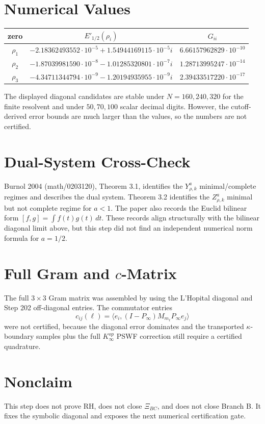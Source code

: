 \documentclass[11pt]{article}
\begin{document}
\section*{Numerical Values}

\begin{center}
\begin{tabular}{c c c}
\toprule
zero & \(E'_{1/2}(\rho_i)\) & \(G_{ii}\)\\
\midrule
\(\rho_1\) & \(-2.18362493552\cdot10^{-5}+1.54944169115\cdot10^{-5}i\) & \(6.66157962829\cdot10^{-10}\)\\
\(\rho_2\) & \(-1.87039981590\cdot10^{-8}-1.01285320801\cdot10^{-7}i\) & \(1.28713995247\cdot10^{-14}\)\\
\(\rho_3\) & \(-4.34711344794\cdot10^{-9}-1.20194935955\cdot10^{-9}i\) & \(2.39433517220\cdot10^{-17}\)\\
\bottomrule
\end{tabular}
\end{center}

The displayed diagonal candidates are stable under \(N=160,240,320\) for the
finite resolvent and under \(50,70,100\) scalar decimal digits.  However, the
cutoff-derived error bounds are much larger than the values, so the numbers
are not certified.

\section*{Dual-System Cross-Check}

Burnol 2004 (math/0203120), Theorem 3.1, identifies the \(Y^a_{\rho,k}\)
minimal/complete regimes and describes the dual system.  Theorem 3.2 identifies
the \(Z^a_{\rho,k}\) minimal but not complete regime for \(a<1\).  The paper
also records the Euclid bilinear form \([f,g]=\int f(t)g(t)\,dt\).  These
records align structurally with the bilinear diagonal limit above, but this
step did not find an independent numerical norm formula for \(a=1/2\).

\section*{Full Gram and \(c\)-Matrix}

The full \(3\times3\) Gram matrix was assembled by using the L'Hopital diagonal
and Step 202 off-diagonal entries.  The commutator entries
\[
c_{ij}(\ell)=\langle e_i,(I-P_\infty)M_{m_\ell}P_\infty e_j\rangle
\]
were not certified, because the diagonal error dominates and the transported
\(\kappa\)-boundary samples plus the full \(K_\infty^{op}\) PSWF correction
still require a certified quadrature.

\section*{Nonclaim}

This step does not prove RH, does not close \(\Xi_{BC}\), and does not close
Branch B.  It fixes the symbolic diagonal and exposes the next numerical
certification gate.
\end{document}
